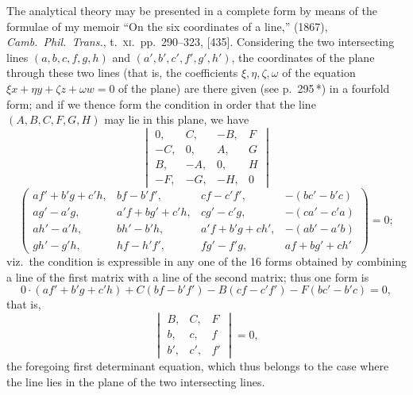\documentclass[11pt,a4paper]{article}
\begin{document}
The analytical theory may be presented in a complete form by means of the formulae of my memoir ``On the six coordinates of a line,'' (1867), \emph{Camb.\ Phil.\ Trans.}, t.\ \textsc{xi}.\ pp.\ 290--323, [435]. Considering the two intersecting lines $(a, b, c, f, g, h)$ and $(a', b', c', f', g', h')$, the coordinates of the plane through these two lines (that is, the coefficients $\xi, \eta, \zeta, \omega$ of the equation $\xi x + \eta y + \zeta z + \omega w = 0$ of the plane) are there given (see p.\ 295\,*) in a fourfold form; and if we thence form the condition in order that the line $(A, B, C, F, G, H)$ may lie in this plane, we have
\[
\begin{vmatrix} 0, & C, & -B, & F \\ -C, & 0, & A, & G \\ B, & -A, & 0, & H \\ -F, & -G, & -H, & 0 \end{vmatrix}
\]
\[
\left(\begin{array}{cccc}
af' + b'g + c'h, & bf - b'f', & cf - c'f', & -(bc' - b'c) \\
ag' - a'g, & a'f + bg' + c'h, & cg' - c'g, & -(ca' - c'a) \\
ah' - a'h, & bh' - b'h, & a'f + b'g + ch', & -(ab' - a'b) \\
gh' - g'h, & hf - h'f', & fg' - f'g, & af + bg' + ch'
\end{array}\right) = 0;
\]
viz.\ the condition is expressible in any one of the 16 forms obtained by combining a line of the first matrix with a line of the second matrix; thus one form is
\[
0 \cdot (af' + b'g + c'h) + C(bf - b'f') - B(cf - c'f') - F(bc' - b'c) = 0,
\]
that is,
\[
\begin{vmatrix} B, & C, & F \\ b, & c, & f \\ b', & c', & f' \end{vmatrix} = 0,
\]
the foregoing first determinant equation, which thus belongs to the case where the line lies in the plane of the two intersecting lines.

\smallskip
{}
\end{document}

